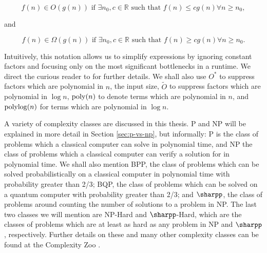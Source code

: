 \begin{equation}
f(n) \in O(g(n)) \textrm{ if } \exists n_0, c \in \mathbb{R} \textrm{ such that } f(n) \leq cg(n) \forall n \geq n_0,
\end{equation}

\noindent and

\begin{equation}
f(n) \in \Omega(g(n)) \textrm{ if } \exists n_0, c \in \mathbb{R} \textrm{ such that } f(n) \geq cg(n) \forall n \geq n_0.
\end{equation}

Intuitively, this notation allows us to simplify expressions by ignoring constant factors and focusing only on the most significant bottlenecks in a runtime. We direct the curious reader to \cite{clrs} for further details. We shall also use $O^*$ to suppress factors which are polynomial in $n$, the input size, $\tilde{O}$ to suppress factors which are polynomial in $\log n$, $\operatorname{poly}(n)$ to denote terms which are polynomial in $n$, and $\operatorname{polylog}(n)$ for terms which are polynomial in $\log n$.

A variety of complexity classes are discussed in this thesis. P and NP will be explained in more detail in Section \ref{sec:p-vs-np}, but informally: P is the class of problems which a classical computer can solve in polynomial time, and NP the class of problems which a classical computer can verify a solution for in polynomial time. We shall also mention BPP, the class of problems which can be solved probabilistically on a classical computer in polynomial time with probability greater than 2/3; BQP, the class of problems which can be solved on a quantum computer with probability greater than 2/3; and $\sharpp$, the class of problems around counting the number of solutions to a problem in NP. The last two classes we will mention are NP-Hard and $\sharpp$-Hard, which are the classes of problems which are at least as hard as any problem in NP and $\sharpp$, respectively. Further details on these and many other complexity classes can be found at the Complexity Zoo \cite{complexityzoo}.
